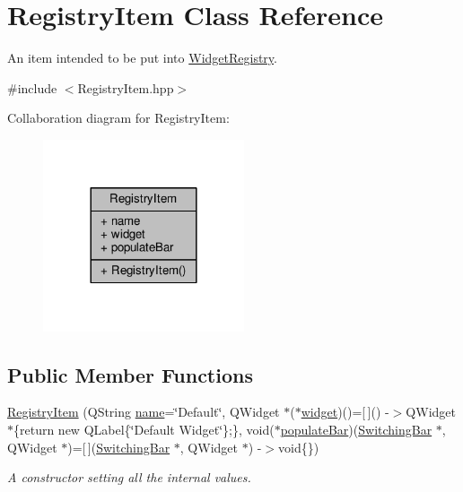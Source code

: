 \hypertarget{class_registry_item}{}\section{Registry\+Item Class Reference}
\label{class_registry_item}


An item intended to be put into \hyperlink{class_widget_registry}{Widget\+Registry}.  




{\ttfamily \#include $<$Registry\+Item.\+hpp$>$}



Collaboration diagram for Registry\+Item\+:
\nopagebreak
\begin{figure}[H]
\begin{center}
\leavevmode
\includegraphics[width=168pt]{class_registry_item__coll__graph}
\end{center}
\end{figure}
\subsection*{Public Member Functions}
\begin{DoxyCompactItemize}
\item 
\hyperlink{class_registry_item_aa10a1fbd1806ad6309c67d763b8ce97c}{Registry\+Item} (Q\+String \hyperlink{class_registry_item_a662d7e2c473bea72a0549caf63ea5bfd}{name}=\char`\"{}Default\char`\"{}, Q\+Widget $\ast$($\ast$\hyperlink{class_registry_item_aa95c5a5dbfdf491e53b07dbc0a027e14}{widget})()=\mbox{[}$\,$\mbox{]}() -\/$>$Q\+Widget $\ast$\{return new Q\+Label\{\char`\"{}Default Widget\char`\"{}\};\}, void($\ast$\hyperlink{class_registry_item_a0784869b48c86a581e12c88fd2706cd0}{populate\+Bar})(\hyperlink{class_switching_bar}{Switching\+Bar} $\ast$, Q\+Widget $\ast$)=\mbox{[}$\,$\mbox{]}(\hyperlink{class_switching_bar}{Switching\+Bar} $\ast$, Q\+Widget $\ast$) -\/$>$void\{\})
\begin{DoxyCompactList}\small\item\em A constructor setting all the internal values. \end{DoxyCompactList}\end{DoxyCompactItemize}

